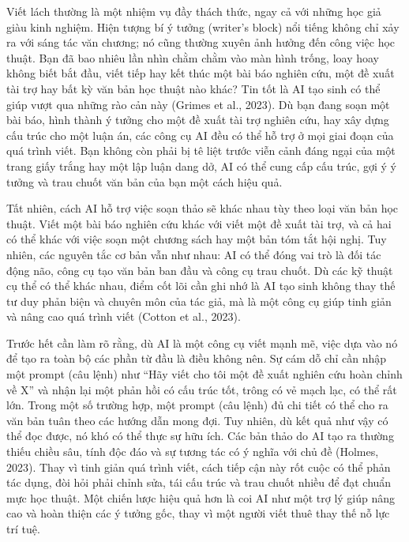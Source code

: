 Viết lách thường là một nhiệm vụ đầy thách thức, ngay cả với những học giả giàu kinh nghiệm. Hiện tượng bí ý tưởng (writer's block) nổi tiếng không chỉ xảy ra với sáng tác văn chương; nó cũng thường xuyên ảnh hưởng đến công việc học thuật. Bạn đã bao nhiêu lần nhìn chằm chằm vào màn hình trống, loay hoay không biết bắt đầu, viết tiếp hay kết thúc một bài báo nghiên cứu, một đề xuất tài trợ hay bất kỳ văn bản học thuật nào khác? Tin tốt là AI tạo sinh có thể giúp vượt qua những rào cản này (Grimes et al., 2023). Dù bạn đang soạn một bài báo, hình thành ý tưởng cho một đề xuất tài trợ nghiên cứu, hay xây dựng cấu trúc cho một luận án, các công cụ AI đều có thể hỗ trợ ở mọi giai đoạn của quá trình viết. Bạn không còn phải bị tê liệt trước viễn cảnh đáng ngại của một trang giấy trắng hay một lập luận dang dở, AI có thể cung cấp cấu trúc, gợi ý ý tưởng và trau chuốt văn bản của bạn một cách hiệu quả.

Tất nhiên, cách AI hỗ trợ việc soạn thảo sẽ khác nhau tùy theo loại văn bản học thuật. Viết một bài báo nghiên cứu khác với viết một đề xuất tài trợ, và cả hai có thể khác với việc soạn một chương sách hay một bản tóm tắt hội nghị. Tuy nhiên, các nguyên tắc cơ bản vẫn như nhau: AI có thể đóng vai trò là đối tác động não, công cụ tạo văn bản ban đầu và công cụ trau chuốt. Dù các kỹ thuật cụ thể có thể khác nhau, điểm cốt lõi cần ghi nhớ là AI tạo sinh không thay thế tư duy phản biện và chuyên môn của tác giả, mà là một công cụ giúp tinh giản và nâng cao quá trình viết (Cotton et al., 2023).

Trước hết cần làm rõ rằng, dù AI là một công cụ viết mạnh mẽ, việc dựa vào nó để tạo ra toàn bộ các phần từ đầu là điều không nên. Sự cám dỗ chỉ cần nhập một prompt (câu lệnh) như ``Hãy viết cho tôi một đề xuất nghiên cứu hoàn chỉnh về X'' và nhận lại một phản hồi có cấu trúc tốt, trông có vẻ mạch lạc, có thể rất lớn. Trong một số trường hợp, một prompt (câu lệnh) đủ chi tiết có thể cho ra văn bản tuân theo các hướng dẫn mong đợi. Tuy nhiên, dù kết quả như vậy có thể đọc được, nó khó có thể thực sự hữu ích. Các bản thảo do AI tạo ra thường thiếu chiều sâu, tính độc đáo và sự tương tác có ý nghĩa với chủ đề (Holmes, 2023). Thay vì tinh giản quá trình viết, cách tiếp cận này rốt cuộc có thể phản tác dụng, đòi hỏi phải chỉnh sửa, tái cấu trúc và trau chuốt nhiều để đạt chuẩn mực học thuật. Một chiến lược hiệu quả hơn là coi AI như một trợ lý giúp nâng cao và hoàn thiện các ý tưởng gốc, thay vì một người viết thuê thay thế nỗ lực trí tuệ.

